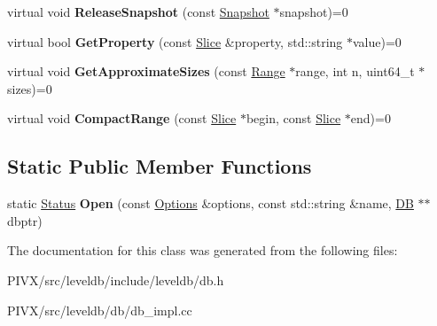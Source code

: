 \begin{DoxyCompactItemize}
\item 
\mbox{\label{classleveldb_1_1_d_b_aa46de65e990bd179db0aee770af89144}} 
virtual void {\bfseries Release\+Snapshot} (const \mbox{\hyperlink{classleveldb_1_1_snapshot}{Snapshot}} $\ast$snapshot)=0
\item 
\mbox{\label{classleveldb_1_1_d_b_afcd557d80bac6668f20372c9e737d807}} 
virtual bool {\bfseries Get\+Property} (const \mbox{\hyperlink{classleveldb_1_1_slice}{Slice}} \&property, std\+::string $\ast$value)=0
\item 
\mbox{\label{classleveldb_1_1_d_b_ad4d54aa1dbcecc8583b013ab2d67aeff}} 
virtual void {\bfseries Get\+Approximate\+Sizes} (const \mbox{\hyperlink{structleveldb_1_1_range}{Range}} $\ast$range, int n, uint64\+\_\+t $\ast$sizes)=0
\item 
\mbox{\label{classleveldb_1_1_d_b_aeea500cbc6704454b3be6908d5da8b3a}} 
virtual void {\bfseries Compact\+Range} (const \mbox{\hyperlink{classleveldb_1_1_slice}{Slice}} $\ast$begin, const \mbox{\hyperlink{classleveldb_1_1_slice}{Slice}} $\ast$end)=0
\end{DoxyCompactItemize}
\subsection*{Static Public Member Functions}
\begin{DoxyCompactItemize}
\item 
\mbox{\label{classleveldb_1_1_d_b_ac1da2b48e911287d86f3a3bfa0f851fe}} 
static \mbox{\hyperlink{classleveldb_1_1_status}{Status}} {\bfseries Open} (const \mbox{\hyperlink{structleveldb_1_1_options}{Options}} \&options, const std\+::string \&name, \mbox{\hyperlink{classleveldb_1_1_d_b}{DB}} $\ast$$\ast$dbptr)
\end{DoxyCompactItemize}


The documentation for this class was generated from the following files\+:\begin{DoxyCompactItemize}
\item 
P\+I\+V\+X/src/leveldb/include/leveldb/db.\+h\item 
P\+I\+V\+X/src/leveldb/db/db\+\_\+impl.\+cc\end{DoxyCompactItemize}
